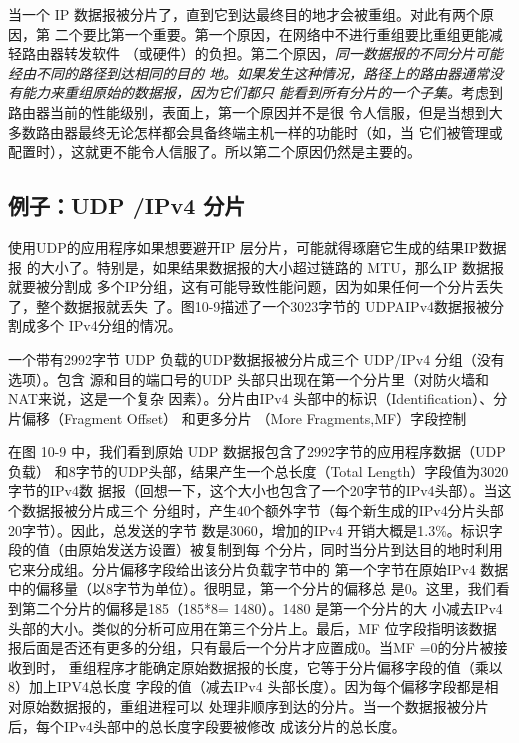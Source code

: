 当一个 IP 数据报被分片了，直到它到达最终目的地才会被重组。对此有两个原因，第
二个要比第一个重要。第一个原因，在网络中不进行重组要比重组更能减轻路由器转发软件
（或硬件）的负担。第二个原因，\emph{同一数据报的不同分片可能经由不同的路径到达相同的目的
  地。如果发生这种情况，路径上的路由器通常没有能力来重组原始的数据报，因为它们都只
能看到所有分片的一个子集。}考虑到路由器当前的性能级别，表面上，第一个原因并不是很
令人信服，但是当想到大多数路由器最终无论怎样都会具备终端主机一样的功能时（如，当
它们被管理或配置时），这就更不能令人信服了。所以第二个原因仍然是主要的。

\subsection{例子：UDP /IPv4 分片}

使用UDP的应用程序如果想要避开IP 层分片，可能就得琢磨它生成的结果IP数据报
的大小了。特别是，如果结果数据报的大小超过链路的 MTU，那么IP 数据报就要被分割成
多个IP分组，这有可能导致性能问题，因为如果任何一个分片丢失了，整个数据报就丢失
了。图10-9描述了一个3023字节的 UDPAIPv4数据报被分割成多个 IPv4分组的情况。

一个带有2992字节 UDP 负载的UDP数据报被分片成三个 UDP/IPv4 分组（没有选项）。包含
源和目的端口号的UDP 头部只出现在第一个分片里（对防火墙和 NAT来说，这是一个复杂
因素）。分片由IPv4 头部中的标识（Identification）、分片偏移（Fragment Offset） 和更多分片
（More Fragments,MF）字段控制

在图 10-9 中，我们看到原始 UDP 数据报包含了2992字节的应用程序数据（UDP 负载）
和8字节的UDP头部，结果产生一个总长度（Total Length）字段值为3020字节的IPv4数
据报（回想一下，这个大小也包含了一个20字节的IPv4头部）。当这个数据报被分片成三个
分组时，产生40个额外字节（每个新生成的IPv4分片头部20字节）。因此，总发送的字节
数是3060，增加的IPv4 开销大概是1.3\%。标识字段的值（由原始发送方设置）被复制到每
个分片，同时当分片到达目的地时利用它来分成组。分片偏移字段给出该分片负载字节中的
第一个字节在原始IPv4 数据中的偏移量（以8字节为单位）。很明显，第一个分片的偏移总
是0。这里，我们看到第二个分片的偏移是185（185*8= 1480）。1480 是第一个分片的大
小减去IPv4 头部的大小。类似的分析可应用在第三个分片上。最后，MF 位字段指明该数据
报后面是否还有更多的分组，只有最后一个分片才应置成0。当MF =0的分片被接收到时，
重组程序才能确定原始数据报的长度，它等于分片偏移字段的值（乘以8）加上IPV4总长度
字段的值（减去IPv4 头部长度）。因为每个偏移字段都是相对原始数据报的，重组进程可以
处理非顺序到达的分片。当一个数据报被分片后，每个IPv4头部中的总长度字段要被修改
成该分片的总长度。


